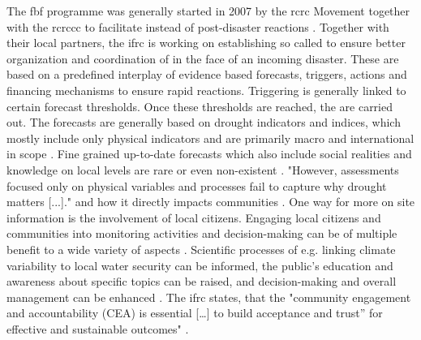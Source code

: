 The \acrshort{fbf} programme was generally started in 2007 by the \acrlong{rcrc} Movement together with the \acrlong{rcrccc} to facilitate  instead of post-disaster reactions \autocite{ifrcForecastbasedFinancingNew2019}. Together with their local partners, the \acrfull{ifrc} is working on establishing so called  to ensure better organization and coordination of  in the face of an incoming disaster. These  are based on a predefined interplay of evidence based forecasts, triggers, actions and financing mechanisms to ensure rapid reactions.\newline
Triggering  is generally linked to certain forecast thresholds. Once these thresholds are reached, the  are carried out. The forecasts are generally based on drought indicators and indices, which mostly include only physical indicators and are primarily macro and international in scope \autocite{svobodaHandbookDroughtIndicators2016}. Fine grained up-to-date forecasts which also include social realities and knowledge on local levels are rare or even non-existent \autocite{enenkelWhyPredictClimate2020,masindeFrameworkPredictingDroughts2010a}. "However, assessments focused only on physical variables and processes fail to capture why drought matters [...]."\autocite[3]{lackstromBackyardHydroclimatologyCitizen2022} and how it directly impacts communities \autocite{boultDroughtImpactbasedForecasting2022,enenkelWhyPredictClimate2020}.\newline
One way for more on site information is the involvement of local citizens. Engaging local citizens and communities into monitoring activities and decision-making can be of multiple benefit to a wide variety of aspects \autocite{scrsFeasibilityStudyPotential2022, njambi-szlapkaIntegratingCommunityVoices}. Scientific processes of e.g. linking climate variability to local water security can be informed, the public's education and awareness about specific topics can be raised, and decision-making and overall management can be enhanced \autocite{huangManagementDrinkingWater2020,kirschkeCitizenScienceProjects2022,minkmanCitizenScienceWater2015}. The \acrshort{ifrc} states, that the "community engagement and accountability (CEA) is essential [\dots] to build acceptance and trust” for effective and sustainable outcomes" \autocite{ifrcCommunityEngagementAccountability}.\newline

